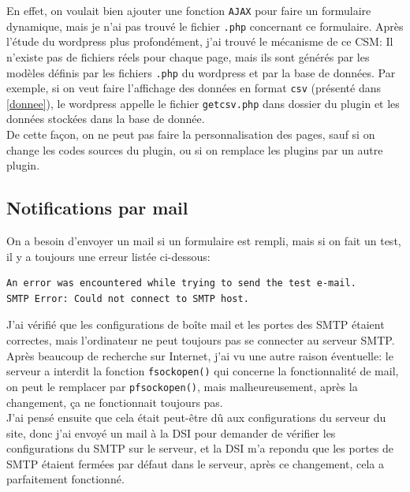 En effet, on voulait bien ajouter une fonction \texttt{AJAX} pour faire un formulaire dynamique, mais je n'ai pas trouvé le fichier \texttt{.php} concernant ce formulaire. Après l'étude du wordpress plus profondément, j'ai trouvé le mécanisme de ce CSM: Il n'existe pas de fichiers réels pour chaque page, mais ils sont générés par les modèles définis par les fichiers \texttt{.php} du wordpress et par la base de données. Par exemple, si on veut faire l'affichage des données en format \texttt{csv} (présenté dans \ref{donnee}), le wordpress appelle le fichier \texttt{getcsv.php} dans dossier du plugin et les données stockées dans la base de donnée.\\

De cette façon, on ne peut pas faire la personnalisation des pages, sauf si on change les codes sources du plugin, ou si on remplace les plugins par un autre plugin. 

\subsection{Notifications par mail}

On a besoin d'envoyer un mail si un formulaire est rempli, mais si on fait un test, il y a toujours une erreur listée ci-dessous:

\begin{verbatim}
An error was encountered while trying to send the test e-mail.
SMTP Error: Could not connect to SMTP host.
\end{verbatim}

J'ai vérifié que les configurations de boîte mail et les portes des SMTP étaient correctes, mais l'ordinateur ne peut toujours pas se connecter au serveur SMTP. Après beaucoup de recherche sur Internet, j'ai vu une autre raison éventuelle: le serveur a interdit la fonction \texttt{fsockopen()} qui concerne la fonctionnalité de mail, on peut le remplacer par \texttt{pfsockopen()}, mais malheureusement, après la changement, ça ne fonctionnait toujours pas.\\

J'ai pensé ensuite que cela était peut-être dû aux configurations du serveur du site, donc j'ai envoyé un mail à la DSI pour demander de vérifier les configurations du SMTP sur le serveur, et la DSI m'a repondu que les portes de SMTP étaient fermées par défaut dans le serveur, après ce changement, cela a parfaitement fonctionné.

